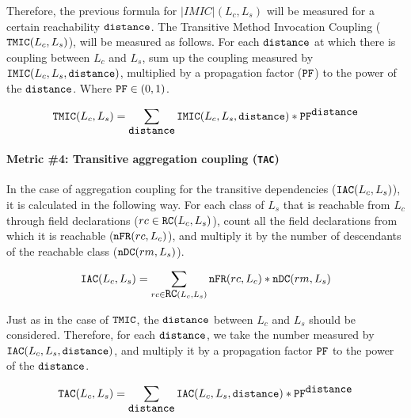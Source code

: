 Therefore, the previous formula for $|IMIC|(L_c,L_s)$ will be measured for a certain reachability $\verb|distance|$. 
The Transitive Method Invocation Coupling ($\verb|TMIC|(L_c,L_s)$), will be measured as follows. For each $\verb|distance|$ at which there is coupling between $L_c$ and $L_s$, sum up the coupling measured by $\verb|IMIC|(L_c,L_s, \verb|distance|)$, multiplied by a propagation factor ($\verb|PF|$) to the power of the $\verb|distance|$. Where $\verb|PF| \in (0,1)$.

\begin{equation}
\label{eqn:tmic}
  \verb|TMIC|(L_c,L_s) = \sum_{\verb|distance|} \verb|IMIC|(L_c,L_s, \verb|distance|) * \verb|PF|^{\verb|distance|}
\end{equation}

\paragraph{Metric \#4: Transitive aggregation coupling (\texttt{TAC})}
In the case of aggregation coupling for the transitive dependencies ($\verb|IAC|(L_c,L_s)$), it is calculated in the following way. For each class of $L_s$ that is reachable from $L_c$ through field declarations ($rc \in \verb|RC|(L_c,L_s)$), count all the field declarations from which it is reachable ($\verb|nFR|(rc,L_c)$), and multiply it by the number of descendants of the reachable class ($\verb|nDC|(rm, L_s)$).

\begin{equation}
\label{eqn:iac}
  \verb|IAC|(L_c,L_s) = \sum_{rc \in \verb|RC|(L_c,L_s)} \verb|nFR|(rc,L_c) * \verb|nDC|(rm, L_s)
\end{equation}

Just as in the case of $\verb|TMIC|$, the $\verb|distance|$ between $L_c$ and $L_s$ should be considered. Therefore, for each $\verb|distance|$, we take the number measured by $\verb|IAC|(L_c,L_s, \verb|distance|)$, and multiply it by a propagation factor $\verb|PF|$ to the power of the $\verb|distance|$.

\begin{equation}
\label{eqn:tac}
  \verb|TAC|(L_c,L_s) = \sum_{\verb|distance|} \verb|IAC|(L_c,L_s, \verb|distance|) * \verb|PF|^{\verb|distance|}
\end{equation}

